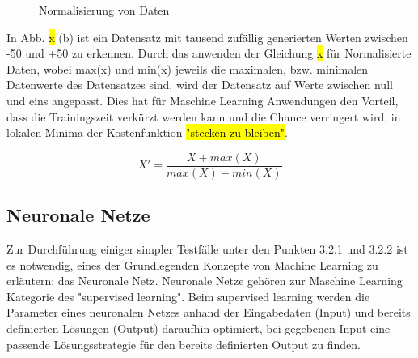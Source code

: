 \begin{figure}[H]
    \centering
    \qquad
    \caption{Normalisierung von Daten}%
    \label{Normalisierung}%
\end{figure}

In Abb. \hl{x} (b) ist ein Datensatz mit tausend zufällig generierten Werten zwischen -50 und +50 zu erkennen. Durch das anwenden der Gleichung \hl{x} für Normalisierte Daten, wobei max(x) und min(x) jeweils die maximalen, bzw. minimalen Datenwerte des Datensatzes sind, wird der Datensatz auf Werte zwischen null und eins angepasst. Dies hat für Maschine Learning Anwendungen den Vorteil, dass die Trainingszeit verkürzt werden kann und die Chance verringert wird, in lokalen Minima der Kostenfunktion \hl{"stecken zu bleiben"}. 

\begin{equation}
\label{Feature Scaling}
X' = \frac{X + max(X)}{max(X) - min(X)}
\end{equation}



\subsection{Neuronale Netze}

Zur Durchführung einiger simpler Testfälle unter den Punkten 3.2.1 und 3.2.2 ist es notwendig, eines der Grundlegenden Konzepte von Machine Learning zu erläutern: das Neuronale Netz.
Neuronale Netze gehören zur Maschine Learning Kategorie des "supervised learning". Beim supervised learning werden die Parameter eines neuronalen Netzes anhand der Eingabedaten (Input) und bereits definierten Lösungen (Output) daraufhin optimiert, bei gegebenen Input eine passende Lösungsstrategie für den bereits definierten Output zu finden. 


